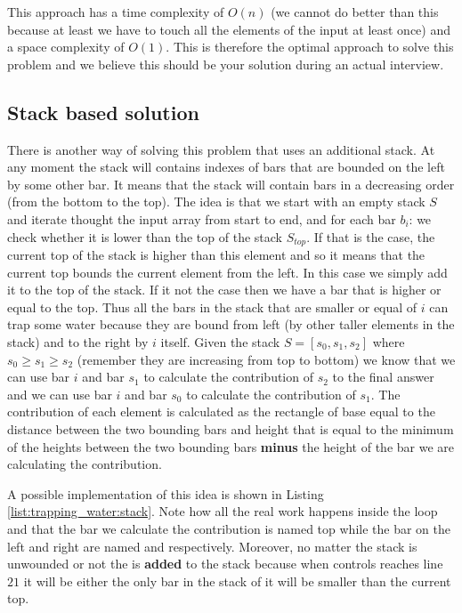 

This approach has a time complexity of $O(n)$ (we cannot do better than this because at least we have to touch all the elements of the input at least once) and a space complexity of $O(1)$. This is therefore the optimal approach to solve this problem  and we believe this should be your solution during an actual interview.


\subsection{Stack based solution}
\label{trapping_water:sec:stack}
There is another way of solving this problem that uses an additional stack. At any moment the stack will contains indexes of bars that are bounded on the left by some other bar. It means that the stack will contain bars in a decreasing order (from the bottom to the top). The idea is that we start with an empty stack $S$ and iterate thought the input array from start to end, and for each bar $b_i$:
we check whether it is lower than the top of the stack $S_{top}$. If that is the case, the current top of the stack is higher than this element and so it means that the current top bounds the current element from the left. In this case we simply add it to the  top of the stack. If it not the case then we have a bar that is higher or equal to the top. Thus  all the bars in the stack that are smaller or equal of $i$ can trap some water because they are bound from left (by other taller elements in the stack) and to the right by $i$ itself.
Given the stack $S=[s_0, s_1,s_2]$ where $s_0 \geq s_1 \geq s_2$ (remember they are increasing from top to bottom) we know that we can use bar $i$ and bar $s_1$ to calculate the contribution of $s_2$ to the final answer and we can use bar $i$ and bar $s_0$ to calculate the contribution of $s_1$. The contribution of each element is calculated as the rectangle of base equal to the distance between the two bounding bars and height that is equal to the minimum of the heights between the two bounding bars \textbf{minus} the height of the bar we are calculating the contribution. 

A possible implementation of this idea is shown in Listing \ref{list:trapping_water:stack}. Note how all the real work happens inside the  loop and that the bar we calculate the contribution is named top while the bar on the left and right are named  and  respectively. Moreover, no matter the stack is unwounded or not the  is \textbf{added} to the stack because when controls reaches line $21$ it will be either the only bar in the stack of it will be smaller than the current top.



